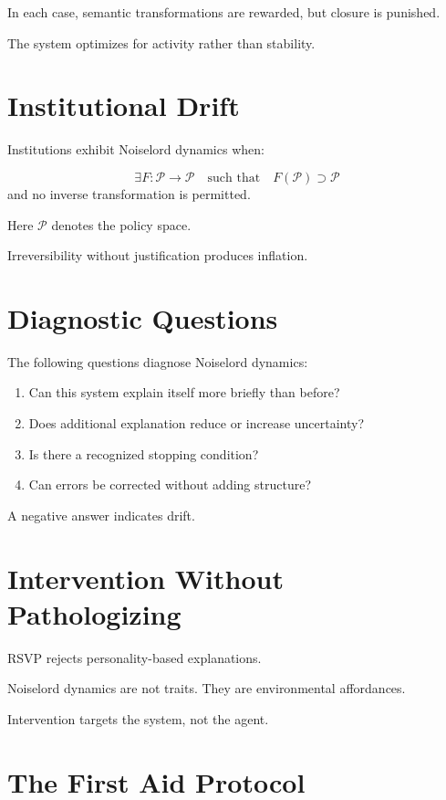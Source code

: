 \documentclass[11pt]{book}
\begin{document}
In each case, semantic transformations are rewarded, but closure is punished.

The system optimizes for activity rather than stability.

\section{Institutional Drift}

Institutions exhibit Noiselord dynamics when:

\[
\exists F : \mathcal{P} \rightarrow \mathcal{P}
\quad \text{such that} \quad
F(\mathcal{P}) \supset \mathcal{P}
\]
and no inverse transformation is permitted.

Here \(\mathcal{P}\) denotes the policy space.

Irreversibility without justification produces inflation.

\section{Diagnostic Questions}

The following questions diagnose Noiselord dynamics:

\begin{enumerate}
\item Can this system explain itself more briefly than before?
\item Does additional explanation reduce or increase uncertainty?
\item Is there a recognized stopping condition?
\item Can errors be corrected without adding structure?
\end{enumerate}

A negative answer indicates drift.

\section{Intervention Without Pathologizing}

RSVP rejects personality-based explanations.

Noiselord dynamics are not traits.
They are environmental affordances.

Intervention targets the system, not the agent.

\section{The First Aid Protocol}
\end{document}

